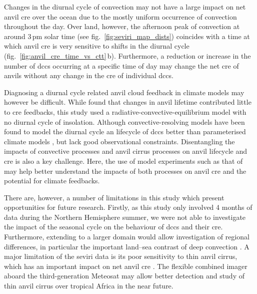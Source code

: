 \documentclass[acp, manuscript]{copernicus}
\begin{document}
Changes in the diurnal cycle of convection may not have a large impact on net anvil \acrshort{cre} over the ocean due to the mostly uniform occurrence of convection throughout the day.
Over land, however, the afternoon peak of convection at around 3\,pm solar time (see fig.~\ref{fig:seviri_map_dists}) coincides with a time at which anvil \acrshort{cre} is very sensitive to shifts in the diurnal cycle (fig.~\ref{fig:anvil_cre_time_vs_ctt}\,b).
Furthermore, a reduction or increase in the number of \acrshort{dcc}s occurring at a specific time of day may change the net \acrshort{cre} of anvils without any change in the \acrshort{cre} of individual \acrshort{dcc}s.

Diagnosing a diurnal cycle related anvil cloud feedback in climate models may however be difficult.
While \citet{beydoun_dissecting_2021} found that changes in anvil lifetime contributed little to \acrshort{cre} feedbacks, this study used a radiative-convective-equilibrium model with no diurnal cycle of insolation.
Although convective-resolving models have been found to model the diurnal cycle an lifecycle of \acrshort{dcc}s better than parameterised climate models \citep{prein_review_2015, feng_mesoscale_2023}, but lack good observational constraints.
Disentangling the impacts of convective processes and anvil cirrus processes on anvil lifecycle and \acrshort{cre} is also a key challenge.
Here, the use of model experiments such as that of \citet{gasparini_diurnal_2022} may help better understand the impacts of both processes on anvil \acrshort{cre} and the potential for climate feedbacks.

There are, however, a number of limitations in this study which present opportunities for future research. 
Firstly, as this study only involved 4 months of data during the Northern Hemisphere summer, we were not able to investigate the impact of the seasonal cycle on the behaviour of \acrshort{dcc}s and their \acrshort{cre}. 
Furthermore, extending to a larger domain would allow investigation of regional differences, in particular the important land--sea contrast of deep convection \citep{takahashi_revisiting_2023}. 
A major limitation of the \acrshort{seviri} data is its poor sensitivity to thin anvil cirrus, which has an important impact on net anvil \acrshort{cre} \citep{protopapadaki_upper_2017, horner_evolution_2023}.
The flexible combined imager \citep{martin_fci_2021} aboard the third-generation Meteosat may allow better detection and study of thin anvil cirrus over tropical Africa in the near future.
\end{document}
